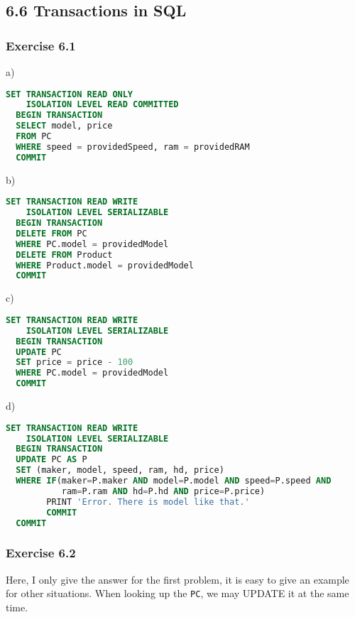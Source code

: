 \documentclass[../../main.tex]{subfiles}
\begin{document}
\subsection*{6.6 Transactions in SQL}

\subsubsection*{Exercise 6.1}

a)

\begin{lstlisting}[language=sql]
  SET TRANSACTION READ ONLY
    ISOLATION LEVEL READ COMMITTED
  BEGIN TRANSACTION
  SELECT model, price
  FROM PC
  WHERE speed = providedSpeed, ram = providedRAM
  COMMIT
\end{lstlisting}

b)

\begin{lstlisting}[language=sql]
  SET TRANSACTION READ WRITE
    ISOLATION LEVEL SERIALIZABLE
  BEGIN TRANSACTION
  DELETE FROM PC
  WHERE PC.model = providedModel
  DELETE FROM Product
  WHERE Product.model = providedModel
  COMMIT
\end{lstlisting}

c)

\begin{lstlisting}[language=sql]
  SET TRANSACTION READ WRITE
    ISOLATION LEVEL SERIALIZABLE
  BEGIN TRANSACTION
  UPDATE PC
  SET price = price - 100
  WHERE PC.model = providedModel
  COMMIT
\end{lstlisting}

d)

\begin{lstlisting}[language=sql]
  SET TRANSACTION READ WRITE
    ISOLATION LEVEL SERIALIZABLE
  BEGIN TRANSACTION
  UPDATE PC AS P
  SET (maker, model, speed, ram, hd, price)
  WHERE IF(maker=P.maker AND model=P.model AND speed=P.speed AND
           ram=P.ram AND hd=P.hd AND price=P.price)
        PRINT 'Error. There is model like that.'
        COMMIT
  COMMIT
\end{lstlisting}

\subsubsection*{Exercise 6.2}

Here, I only give the answer for the first problem, it is easy to give an example for
other situations. When looking up the \verb|PC|, we may UPDATE it at the same time.
\end{document}
